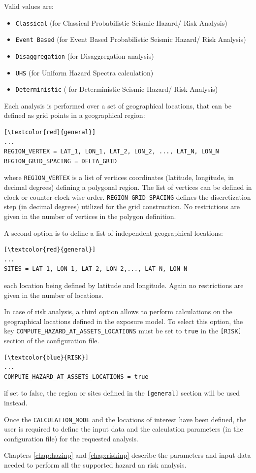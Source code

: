 Valid values are: 
\begin{itemize}
\item \Verb+Classical+ (for Classical Probabilistic Seismic Hazard/ Risk Analysis)
\item \Verb+Event Based+ (for Event Based Probabilistic Seismic Hazard/ Risk Analysis)
\item \Verb+Disaggregation+ (for Disaggregation analysis)
\item \Verb+UHS+ (for Uniform Hazard Spectra calculation)
\item \Verb+Deterministic+ ( for Deterministic Seismic Hazard/ Risk Analysis)
\end{itemize}

Each analysis is performed over a set of geographical locations, that can be defined as grid points in a geographical region:

\begin{Verbatim}[frame=single, commandchars=\\\{\}, samepage=true]
[\textcolor{red}{general}]
...
REGION_VERTEX = LAT_1, LON_1, LAT_2, LON_2, ..., LAT_N, LON_N
REGION_GRID_SPACING = DELTA_GRID
\end{Verbatim}

where \Verb+REGION_VERTEX+ is a list of vertices coordinates (latitude, longitude, in decimal degrees) defining a polygonal region. The list of vertices can be defined in clock or counter-clock wise order. \Verb+REGION_GRID_SPACING+ defines the discretization step (in decimal degrees) utilized for the grid construction. No restrictions are given in the number of vertices in the polygon definition.

A second option is to define a list of independent geographical locations:
\begin{Verbatim}[frame=single, commandchars=\\\{\}, samepage=true]
[\textcolor{red}{general}]
...
SITES = LAT_1, LON_1, LAT_2, LON_2,..., LAT_N, LON_N
\end{Verbatim}
each location being defined by latitude and longitude. Again no restrictions are given in the number of locations.

In case of risk analysis, a third option allows to perform calculations on the geographical locations defined in the exposure model. To select this option, the key \Verb+COMPUTE_HAZARD_AT_ASSETS_LOCATIONS+ must be set to \Verb+true+ in the \Verb+[RISK]+ section of the configuration file.
\begin{Verbatim}[frame=single, commandchars=\\\{\}, samepage=true]
[\textcolor{blue}{RISK}]
...
COMPUTE_HAZARD_AT_ASSETS_LOCATIONS = true
\end{Verbatim}
if set to false, the region or sites defined in the \Verb+[general]+ section will be used instead.

Once the \Verb+CALCULATION_MODE+ and the locations of interest have been defined, the user is required to define the input data and the calculation parameters (in the configuration file) for the requested analysis.

Chapters \ref{chap:hazinp} and \ref{chap:riskinp} describe the parameters and input data needed to perform all the supported hazard an risk analysis.